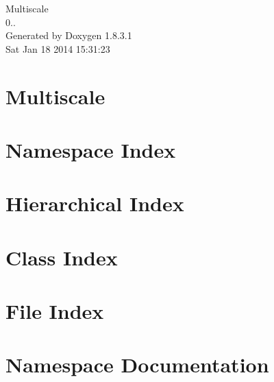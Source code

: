 \documentclass{book}
\begin{document}
\hypersetup{pageanchor=false,citecolor=blue}
\begin{titlepage}
\vspace*{7cm}
\begin{center}
{\Large Multiscale \\[1ex]\large 0.. }\\
\vspace*{1cm}
{\large Generated by Doxygen 1.8.3.1}\\
\vspace*{0.5cm}
{\small Sat Jan 18 2014 15:31:23}\\
\end{center}
\end{titlepage}
\clearemptydoublepage
{}
\tableofcontents
\clearemptydoublepage
{}
\hypersetup{pageanchor=true,citecolor=blue}
\chapter{Multiscale}
\label{index}\hypertarget{index}{}
\chapter{Namespace Index}

\chapter{Hierarchical Index}

\chapter{Class Index}

\chapter{File Index}

\chapter{Namespace Documentation}




\end{document}
